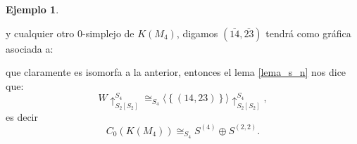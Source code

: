 \documentclass[12pt]{book}
\theoremstyle{definition}
\newtheorem{example}[theorem]{Ejemplo}
\newcounter{in}
\begin{document}
\begin{example}
\begin{center}
\end{center}
y cualquier otro $0$-simplejo de $K(M_{4})$, digamos $(\overline{14},\overline{23})$
tendrá como gráfica asociada a:
\begin{center}
\end{center}
que claramente es isomorfa a la anterior, entonces el lema
\ref{lema_s_n} nos dice que:
\begin{equation}
W \uparrow_{S_{2} \left [ S_{2} \right ]}^{S_{4}} \cong_{S_{4}} \langle \left \{ (14,23) \right \} \rangle \uparrow_{S_{2} \left [ S_{2} \right ]}^{S_{4}},
\end{equation}
es decir
\begin{equation}
C_{0}(K(M_{4})) \cong_{S_{4}} S^{(4)} \oplus S^{(2,2)}.
\end{equation}
\end{example}
\end{document}
